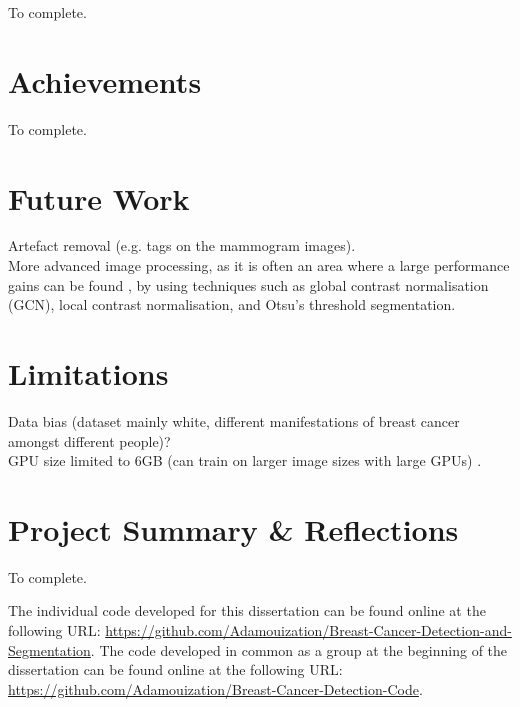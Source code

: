 To complete.


\section{Achievements}

To complete.
    

\section{Future Work}

Artefact removal (e.g. tags on the mammogram images).\\

More advanced image processing, as it is often an area where a large performance gains can be found \citep{Litjens2017}, by using techniques such as global contrast normalisation (GCN), local contrast normalisation, and Otsu’s threshold segmentation.


\section{Limitations}
\label{sec:conclusions-limitations}

Data bias (dataset mainly white, different manifestations of breast cancer amongst different people)?\\

GPU size limited to 6GB (can  train on larger image sizes with large GPUs) \citep{Shen2017}.
    

\section{Project Summary \& Reflections}

To complete.

The individual code developed for this dissertation can be found online at the following URL: \url{https://github.com/Adamouization/Breast-Cancer-Detection-and-Segmentation}. The code developed in common as a group at the beginning of the dissertation can be found online at the following URL: \url{https://github.com/Adamouization/Breast-Cancer-Detection-Code}.